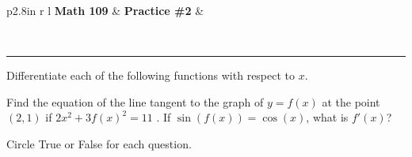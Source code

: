 \documentclass[11pt]{exam}
\newcommand{\class}{Math 109}
\newcommand*{\TrueFalse}[1]{%
\ifprintanswers
    \ifthenelse{\equal{#1}{T}}{%
        \textbf{TRUE}\hspace*{14pt}False
    }{
        True\hspace*{14pt}\textbf{FALSE}
    }
\else
    {True}\hspace*{20pt}False
\fi
}
\newlength\TFlengthA
\newlength\TFlengthB
\newcommand\TFQuestion[2]{%
    \setlength\TFlengthB{\linewidth}
    \addtolength\TFlengthB{-\TFlengthA}
    \parbox[t]{\TFlengthA}{\TrueFalse{#1}}\parbox[t]{\TFlengthB}{#2}}
\begin{document}
 

\pagestyle{head}

\begin{flushright}
\begin{tabular}{p{2.8in} r l}
\textbf{\class} & \textbf{Practice \#2} & \makebox[2in]{}\\
\end{tabular}\\
\end{flushright}
\rule[1ex]{\textwidth}{.1pt}

\begin{questions}
\question Differentiate each of the following functions with respect to $x$.
\bigskip\bigskip\bigskip\bigskip\bigskip
	\question Find the equation of the line tangent to the graph of $y = f(x)$ at the point $(2,1)$ if $2x^2 + 3f(x)^2 = 11$ .
	\bigskip\bigskip\bigskip\bigskip
	\question If $\sin(f(x)) = \cos(x)$, what is $f'(x)$?
		\bigskip\bigskip\bigskip\bigskip

\question Circle True or False for each question.  
\end{questions}
\end{document}
